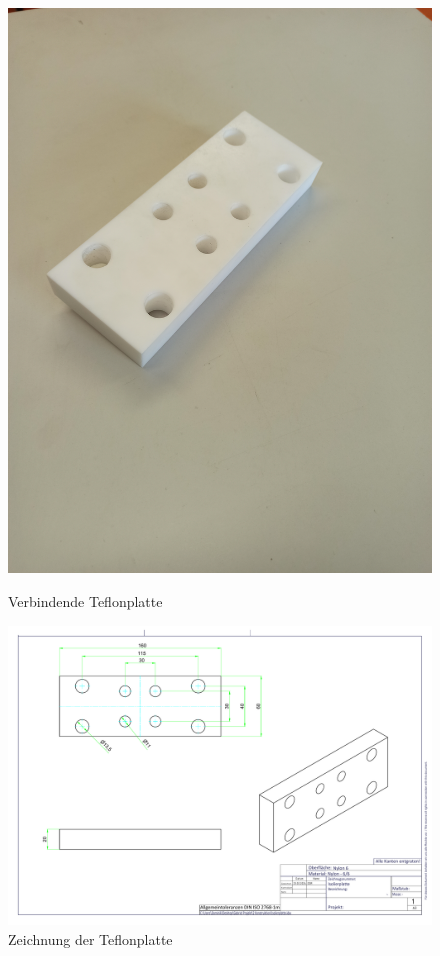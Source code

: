 \begin{figure}[H]
	\begin{minipage}[b]{.4\linewidth} %
		\includegraphics[width=\linewidth]{../ref/Teflon-Platte.jpg}
		\caption{Verbindende Teflonplatte}
		\label{fig:Teflonplatte}
	\end{minipage}
	\hspace{.1\linewidth}%
	\begin{minipage}[b]{.4\linewidth} %
		\includegraphics[width=\linewidth]{../ref/Isolierplatte.pdf}
		\caption{Zeichnung der Teflonplatte}
	\end{minipage}
\end{figure}

